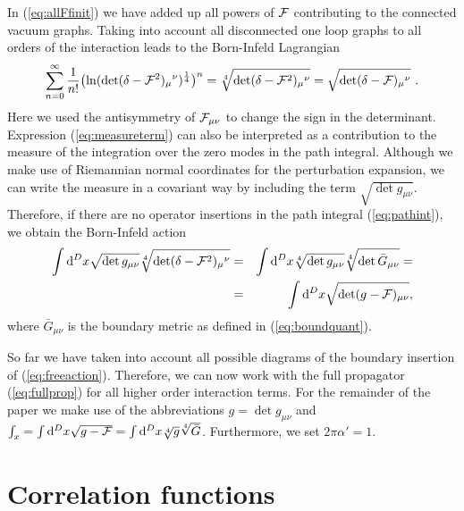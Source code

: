 \documentclass[a4paper,12pt]{article}
\newcommand {\ud} {\mathrm{d}}
\newcommand {\cF} {{\cal F}}
\begin{document}
In (\ref{eq:allFfinit}) we have added up all powers of $\cF$ contributing to 
the connected vacuum graphs. Taking into account all disconnected one loop 
graphs to all orders of the interaction leads to the 
Born-Infeld Lagrangian
\begin{eqnarray}
  \label{eq:measureterm}
  \sum_{n=0}^\infty \frac 1{n!} 
  \bigl(\ln (\det (\delta - \cF^2)_\mu{}^\nu)^{\frac 14}\bigr)^n = 
  \root 4 \of {\det (\delta - \cF^2)_\mu{}^\nu} =
  \sqrt {\det (\delta - \cF)_\mu{}^\nu}~.
\end{eqnarray}
Here we used the antisymmetry of $\cF_{\mu\nu}$ to change the sign in the 
determinant. Expression (\ref{eq:measureterm}) can also be interpreted as
a contribution to the measure of the integration
over the zero modes in the path integral. Although we make use of
Riemannian normal coordinates for the perturbation expansion, we can
write the measure in a covariant way by including the term 
$\sqrt {\det g_{\mu\nu}}$. Therefore, if there are no operator insertions 
in the path integral (\ref{eq:pathint}), we obtain the Born-Infeld action
\begin{eqnarray}
  \label{eq:BIAction}
  \int \ud^{D} x \sqrt {\det g_{\mu\nu}} 
                 \root 4 \of {\det (\delta - \cF^2)_\mu{}^\nu} &=&
  \int \ud^{D} x \root 4 \of {\det g_{\mu\nu}} 
                 \root 4 \of {\det \bar G_{\mu\nu}} = \nonumber \\
  &=& \int \ud^{D} x \sqrt{\det (g - \cF)_{\mu\nu}},
\end{eqnarray}
where $\bar G_{\mu\nu}$ is the boundary metric as defined in 
(\ref{eq:boundquant}).

So far we have taken into account all possible diagrams of the boundary
insertion of (\ref{eq:freeaction}).
Therefore, we can now work with the full propagator (\ref{eq:fullprop})
for all higher order interaction terms.
%
For the remainder of the paper we make use of the abbreviations
$g = \det g_{\mu\nu}$ and
$\int_x =\int\ud^{D}x\sqrt{g-\cF}=\int\ud^{D}x\root 4\of{g}\root 4\of{\bar G}$.
Furthermore, we set $2\pi\alpha'=1$.


\section{Correlation functions}
\label{sec:corr}
\end{document}
